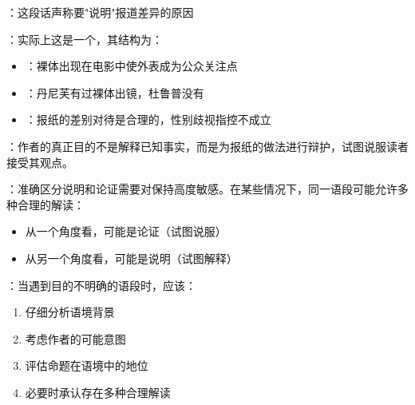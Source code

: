 \begin{theorembox}[title=深层分析：说明还是论证？]
：这段话声称要"说明"报道差异的原因

：实际上这是一个，其结构为：
\begin{itemize}
  \item {}：裸体出现在电影中使外表成为公众关注点
  \item {}：丹尼芙有过裸体出镜，杜鲁普没有
  \item {}：报纸的差别对待是合理的，性别歧视指控不成立
\end{itemize}

：作者的真正目的不是解释已知事实，而是为报纸的做法进行辩护，试图说服读者接受其观点。
\end{theorembox}

：准确区分说明和论证需要对保持高度敏感。在某些情况下，同一语段可能允许多种合理的解读：
\begin{itemize}
  \item 从一个角度看，可能是论证（试图说服）
  \item 从另一个角度看，可能是说明（试图解释）
\end{itemize}

：当遇到目的不明确的语段时，应该：
\begin{enumerate}
  \item 仔细分析语境背景
  \item 考虑作者的可能意图
  \item 评估命题在语境中的地位
  \item 必要时承认存在多种合理解读
\end{enumerate}

